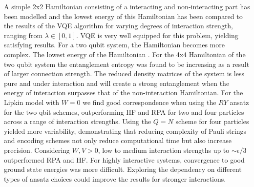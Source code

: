 A simple 2x2 Hamiltonian consisting of a interacting and non-interacting part has been modelled and the lowest energy of this Hamiltonian has been compared to the results of the VQE algorithm for varying degrees of interaction strength, ranging from $\lambda \in [0,1]$. VQE is very well equipped for this problem, yielding satisfying results. For a two qubit system, the Hamiltonian becomes more complex. The lowest energy of the Hamiltonian .
\newline For the 4x4 Hamiltonian of the two qubit system the entanglement entropy was found to be increasing as a result of larger connection strength. The reduced density matrices of the system is less pure and under interaction and will create a strong entanglement when the energy of interaction surpasses that of the non-interaction Hamiltonian. 
\newline
For the Lipkin model with $W=0$ we find good correspondence when using the $RY$ ansatz for the two qbit schemes, outperforming HF and RPA for two and four particles across a range of interaction strengths. Using the $Q = N$ scheme for four particles yielded more variability, demonstrating that reducing complexity of Pauli strings and encoding schemes not only reduce computational time but also increase precision. Considering $W, V > 0$, low to medium interaction strengths up to $\sim \epsilon/3$ outperformed RPA and HF. For highly interactive systems, convergence to good ground state energies was more difficult. Exploring the dependency on different types of ansatz choices could improve the results for stronger interactions.
